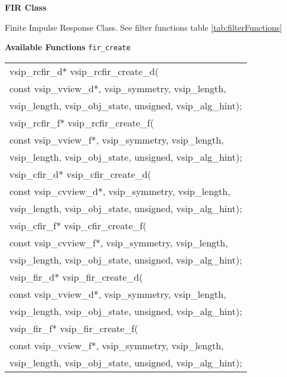\clearpage
{\large \textbf{\hypertarget{firFunc}{FIR Class}}}\vspace{.2cm}\\
\hspace*{.3cm}
\parbox{0.85\textwidth}{Finite Impulse Response Class. See filter functions table \ref{tab:filterFunctions}}
\cvsiplh 
\newline \hspace*{.8cm} \vspace*{.1cm} \textbf{Available Functions }
\newline \hspace*{.8cm} \vspace*{.1cm} \texttt{fir\_create}
\newline \hspace*{1.1cm} {
\ttfamily
\begin{tabular}[H]{l}
vsip\_rcfir\_d* vsip\_rcfir\_create\_d(\\*\hspace{.7cm}const vsip\_vview\_d*, vsip\_symmetry, vsip\_length,\\*\hspace{.7cm}vsip\_length, vsip\_obj\_state, unsigned, vsip\_alg\_hint);\\
vsip\_rcfir\_f* vsip\_rcfir\_create\_f(\\*\hspace{.7cm}const vsip\_vview\_f*, vsip\_symmetry, vsip\_length,\\*\hspace{.7cm}vsip\_length, vsip\_obj\_state, unsigned, vsip\_alg\_hint);\\
vsip\_cfir\_d* vsip\_cfir\_create\_d(\\*\hspace{.7cm}const vsip\_cvview\_d*, vsip\_symmetry, vsip\_length,\\*\hspace{.7cm}vsip\_length, vsip\_obj\_state, unsigned, vsip\_alg\_hint);\\
vsip\_cfir\_f* vsip\_cfir\_create\_f(\\*\hspace{.7cm}const vsip\_cvview\_f*, vsip\_symmetry, vsip\_length,\\*\hspace{.7cm}vsip\_length, vsip\_obj\_state, unsigned, vsip\_alg\_hint);\\
vsip\_fir\_d* vsip\_fir\_create\_d(\\*\hspace{.7cm}const vsip\_vview\_d*, vsip\_symmetry, vsip\_length,\\*\hspace{.7cm}vsip\_length, vsip\_obj\_state, unsigned, vsip\_alg\_hint);\\
vsip\_fir\_f* vsip\_fir\_create\_f(\\*\hspace{.7cm}const vsip\_vview\_f*, vsip\_symmetry, vsip\_length,\\*\hspace{.7cm}vsip\_length, vsip\_obj\_state, unsigned, vsip\_alg\_hint);\\
\end{tabular}
}
